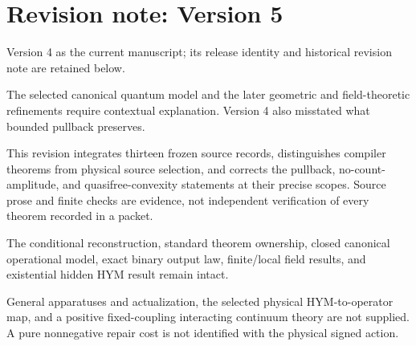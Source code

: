 \documentclass[11pt]{article}
\theoremstyle{definition}
\theoremstyle{remark}
\let\MTToriginalitem\item
\renewcommand{\item}{\par\MTToriginalitem}
\begin{document}
\section*{Revision note: Version 5}
\begin{description}[leftmargin=2.5cm,style=nextline]
\item[Supersedes] Version 4 as the current manuscript; its release identity
and historical revision note are retained below.
\item[Reason] The selected canonical quantum model and the later geometric
and field-theoretic refinements require contextual explanation. Version 4
also misstated what bounded pullback preserves.
\item[Resolution] This revision integrates thirteen frozen source records,
distinguishes compiler theorems from physical source selection, and corrects
the pullback, no-count-amplitude, and quasifree-convexity statements at their
precise scopes. Source prose and finite checks are evidence, not independent
verification of every theorem recorded in a packet.
\item[Retained] The conditional reconstruction, standard theorem ownership,
closed canonical operational model, exact binary output law, finite/local
field results, and existential hidden HYM result remain intact.
\item[Open boundary] General apparatuses and actualization, the selected
physical HYM-to-operator map, and a positive fixed-coupling interacting
continuum theory are not supplied. A pure nonnegative repair cost is not
identified with the physical signed action.
\end{description}
\end{document}
